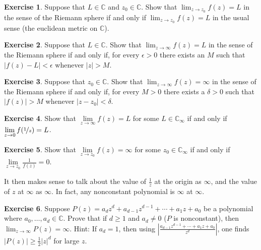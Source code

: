 \documentclass[12pt,openany]{book}
\newcommand{\sabs}[1]{\lvert {#1} \rvert}
\newcommand{\abs}[1]{\left\lvert {#1} \right\rvert}
\newcommand{\C}{{\mathbb{C}}}
\theoremstyle{plain}
\theoremstyle{remark}
\theoremstyle{definition}
\newenvironment{exbox}{%
    \def\FrameCommand{\vrule width 1pt \relax\hspace{10pt}}%
    \MakeFramed{\advance\hsize-\width\FrameRestore}%
}{%
    \endMakeFramed
}
\theoremstyle{exercise}
\newtheorem{exercise}{Exercise}[section]
\theoremstyle{example}
\begin{document}
\begin{exbox}
\begin{exercise}
Suppose that $L \in \C$ and $z_0 \in \C$.
Show that $\lim_{z\to z_0} f(z) = L$ in the sense of the Riemann sphere
if and only if $\lim_{z \to z_0} f(z) = L$ in the usual sense (the euclidean
metric on $\C$).
\end{exercise}

\begin{exercise}
Suppose that $L \in \C$.
Show that $\lim_{z\to \infty} f(z) = L$ in the sense of the Riemann sphere
if and only if, for every $\epsilon > 0$ there exists an $M$ such that
$\sabs{f(z)-L} < \epsilon$ whenever $\sabs{z} > M$.
\end{exercise}

\begin{exercise}
Suppose that $z_0 \in \C$.
Show that $\lim_{z\to \infty} f(z) = \infty$ in the sense of the Riemann sphere
if and only if, for every $M > 0$ there exists a $\delta > 0$ such that
$\sabs{f(z)} > M$ whenever $\sabs{z-z_0} < \delta$.
\end{exercise}

\begin{exercise}
Show that $\lim\limits_{z\to\infty} f(z) = L$ for some $L \in \C_\infty$ if and only if
$\lim\limits_{z \to 0} f(\nicefrac{1}{z}) = L$.
\end{exercise}

\begin{exercise}
Show that $\lim\limits_{z\to z_0} f(z) = \infty$ for some $z_0 \in \C_\infty$ if and only if
$\lim\limits_{z \to z_0} \frac{1}{f(z)} = 0$.
\end{exercise}
\end{exbox}

It then makes sense to talk about the value of $\frac{1}{z}$ at the origin
as $\infty$, and the value of $z$ at $\infty$ as $\infty$.
In fact, any nonconstant polynomial is $\infty$ at $\infty$.

\begin{exbox}
\begin{exercise} \label{exercise:polygoesinf}
Suppose $P(z) = a_d z^d + a_{d-1} z^{d-1} + \cdots + a_1 z + a_0$ be
a polynomial where $a_0,\ldots,a_d \in \C$.  Prove that if $d \geq 1$
and $a_d \not=0$ ($P$ is nonconstant),
then $\lim_{z \to \infty} P(z) = \infty$.
Hint: If $a_d = 1$, then using
$\abs{\frac{a_{d-1} z^{d-1} + \cdots + a_1 z + a_0}{z^d}}$, one finds
$\abs{P(z)} \geq \frac{1}{2} \sabs{z}^d$ for large $z$.
\end{exercise}
\end{exbox}
\end{document}
